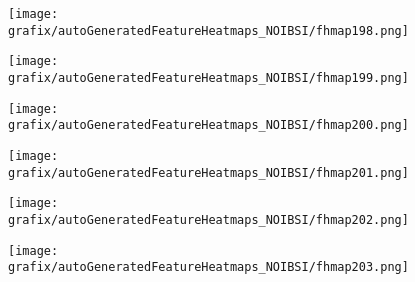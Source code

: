 \hspace{\hsp} 
\begin{subfigure}{\wid\textwidth} 
    \centering 
    \caption{\tiny \sffamily {}} 
    \vspace{\vsp} 
    \texttt{[image: grafix/autoGeneratedFeatureHeatmaps\_NOIBSI/fhmap198.png]} 
\end{subfigure} 
\hspace{\hsp} 
\begin{subfigure}{\wid\textwidth} 
    \centering 
    \caption{\tiny \sffamily {}} 
    \vspace{\vsp} 
    \texttt{[image: grafix/autoGeneratedFeatureHeatmaps\_NOIBSI/fhmap199.png]} 
\end{subfigure} 
\hspace{\hsp} 
\begin{subfigure}{\wid\textwidth} 
    \centering 
    \caption{\tiny \sffamily {}} 
    \vspace{\vsp} 
    \texttt{[image: grafix/autoGeneratedFeatureHeatmaps\_NOIBSI/fhmap200.png]} 
\end{subfigure} 
\hspace{\hsp} 
\begin{subfigure}{\wid\textwidth} 
    \centering 
    \caption{\tiny \sffamily {}} 
    \vspace{\vsp} 
    \texttt{[image: grafix/autoGeneratedFeatureHeatmaps\_NOIBSI/fhmap201.png]} 
\end{subfigure} 
\hspace{\hsp} 
\begin{subfigure}{\wid\textwidth} 
    \centering 
    \caption{\tiny \sffamily {}} 
    \vspace{\vsp} 
    \texttt{[image: grafix/autoGeneratedFeatureHeatmaps\_NOIBSI/fhmap202.png]} 
\end{subfigure} 
\hspace{\hsp} 
\begin{subfigure}{\wid\textwidth} 
    \centering 
    \caption{\tiny \sffamily {}} 
    \vspace{\vsp} 
    \texttt{[image: grafix/autoGeneratedFeatureHeatmaps\_NOIBSI/fhmap203.png]} 
\end{subfigure} 
\hspace{\hsp} 
